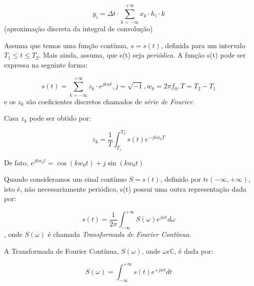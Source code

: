 \documentclass[a4paper,12pt]{article}
\begin{document}
$$ y_i = \Delta t \cdot \sum_{k=-\infty}^{+\infty}{x_k \cdot h_i \cdot k} $$ (aproximação discreta da integral de convolução)

Assuma que temos uma função contínua, $ s = s(t) $, definida para um intervalo $ T_1 \leq  t \leq T_2 $. Mais ainda, assuma, que s(t) seja \textit{periódica}. A função s(t) pode ser expressa na seguinte forma:

$$ s(t) = \sum_{k=-\infty}^{+\infty}{z_k \cdot e^{jkwt}}, j = \sqrt{-1}, w_0 = 2 \pi f_0 , T = T_2 - T_1 $$ e os $ z_k $ são coeficientes discretos chamados de \textit{série de Fourier}.

Casa $ z_k $ pode ser obtido por:

$$ z_k = \frac{1}{T} \int_{T_1}^{T_2}{s(t)e^{-jkw_0T}} $$

De fato, $e^{jkw_0t} = \cos{(kw_0t)} + j\sin{(kw_0t)} $

Quando consideramos um sinal contínuo $ S = s(t) $, definido por $ t \epsilon \left( -\infty, +\infty \right) $, isto é, não necessariamente periódico, s(t) possui uma outra representação dada por:

$$ s(t) = \frac{1}{2 \pi} \int_{-\infty}^{+\infty}{S(\omega)e^{jwt} d\omega} $$, onde $ S(\omega) $ é chamada \textit{Transformada de Fourier Contínua}.

A Transformada de Fourier Contínua, $ S(\omega) $, onde $ \omega \epsilon \mathbb{C} $, é dada por:

$$ S(\omega) = \int_{-\infty}^{+\infty}{s(t)e^{+jwt} dt} $$
\end{document}
